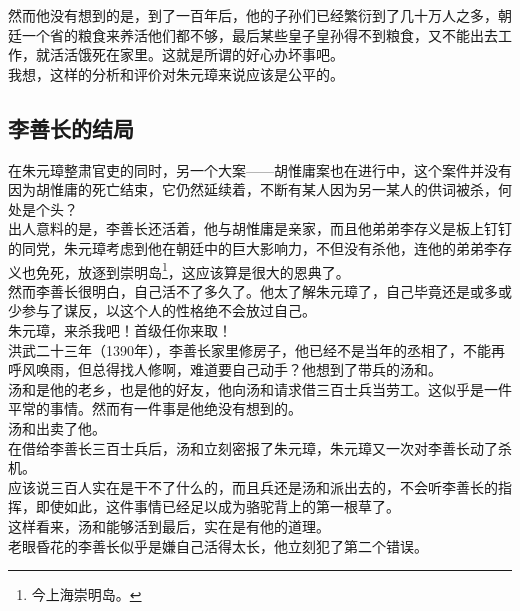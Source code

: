 \begin{multicols}{\theparacolNo}
然而他没有想到的是，到了一百年后，他的子孙们已经繁衍到了几十万人之多，朝廷一个省的粮食来养活他们都不够，最后某些皇子皇孙得不到粮食，又不能出去工作，就活活饿死在家里。这就是所谓的好心办坏事吧。\\

我想，这样的分析和评价对朱元璋来说应该是公平的。\\

\subsection{李善长的结局}
在朱元璋整肃官吏的同时，另一个大案——胡惟庸案也在进行中，这个案件并没有因为胡惟庸的死亡结束，它仍然延续着，不断有某人因为另一某人的供词被杀，何处是个头？\\

出人意料的是，李善长还活着，他与胡惟庸是亲家，而且他弟弟李存义是板上钉钉的同党，朱元璋考虑到他在朝廷中的巨大影响力，不但没有杀他，连他的弟弟李存义也免死，放逐到崇明岛\footnote{今上海崇明岛。}，这应该算是很大的恩典了。\\

然而李善长很明白，自己活不了多久了。他太了解朱元璋了，自己毕竟还是或多或少参与了谋反，以这个人的性格绝不会放过自己。\\

朱元璋，来杀我吧！首级任你来取！\\

洪武二十三年（1390年），李善长家里修房子，他已经不是当年的丞相了，不能再呼风唤雨，但总得找人修啊，难道要自己动手？他想到了带兵的汤和。\\

汤和是他的老乡，也是他的好友，他向汤和请求借三百士兵当劳工。这似乎是一件平常的事情。然而有一件事是他绝没有想到的。\\

汤和出卖了他。\\

在借给李善长三百士兵后，汤和立刻密报了朱元璋，朱元璋又一次对李善长动了杀机。\\

应该说三百人实在是干不了什么的，而且兵还是汤和派出去的，不会听李善长的指挥，即使如此，这件事情已经足以成为骆驼背上的第一根草了。\\

这样看来，汤和能够活到最后，实在是有他的道理。\\

老眼昏花的李善长似乎是嫌自己活得太长，他立刻犯了第二个错误。\\


\end{multicols}
